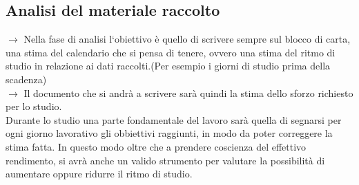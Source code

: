\documentclass[11pt,a4paper]{article}
\begin{document}
\subsection{Analisi del materiale raccolto}
$\rightarrow$ Nella fase di analisi l`obiettivo è quello di scrivere sempre sul blocco di carta, una stima del calendario che si pensa di tenere, ovvero una stima del ritmo di studio in relazione ai dati raccolti.(Per esempio i giorni di studio prima della scadenza)\\
$\rightarrow$ Il documento che si andrà a scrivere sarà quindi la stima dello sforzo richiesto per lo studio.\\
Durante lo studio una parte fondamentale del lavoro sarà quella di segnarsi per ogni giorno lavorativo gli obbiettivi raggiunti, in modo da poter correggere la stima fatta. In questo modo oltre che a prendere coscienza del effettivo rendimento, si avrà anche un valido strumento per valutare la possibilità di aumentare oppure ridurre il ritmo di studio.\\
\end{document}
